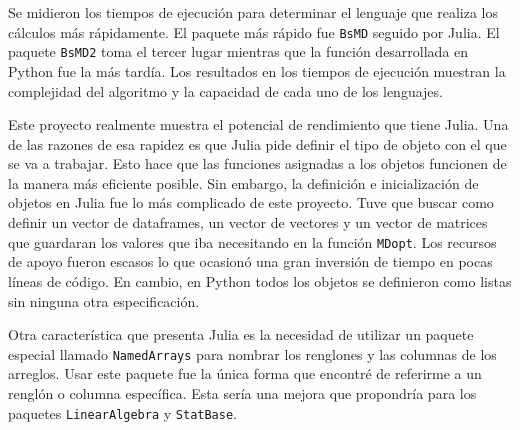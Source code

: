 Se midieron los tiempos de ejecución para determinar el lenguaje que realiza los cálculos más rápidamente. El paquete más rápido fue \texttt{BsMD} seguido por \textsf{Julia}. El paquete \texttt{BsMD2} toma el tercer lugar mientras que la función desarrollada en \textsf{Python} fue la más tardía. Los resultados en los tiempos de ejecución muestran la complejidad del algoritmo y la capacidad de cada uno de los lenguajes. 

Este proyecto realmente muestra el potencial de rendimiento que tiene \textsf{Julia}. Una de las razones de esa rapidez es que \textsf{Julia} pide definir el tipo de objeto con el que se va a trabajar. Esto hace que las funciones asignadas a los objetos funcionen de la manera más eficiente posible. Sin embargo, la definición e inicialización de objetos en \textsf{Julia} fue lo más complicado de este proyecto. Tuve que buscar como definir un vector de dataframes, un vector de vectores y un vector de matrices que guardaran los valores que iba necesitando en la función \texttt{MDopt}. Los recursos de apoyo fueron escasos lo que ocasionó una gran inversión de tiempo en pocas líneas de código. En cambio, en \textsf{Python} todos los objetos se definieron como listas sin ninguna otra especificación. 

Otra característica que presenta \textsf{Julia} es la necesidad de utilizar un paquete especial llamado \texttt{NamedArrays} para nombrar los renglones y las columnas de los arreglos. Usar este paquete fue la única forma que encontré de referirme a un renglón o columna específica. Esta sería una mejora que propondría para los paquetes \texttt{LinearAlgebra} y \texttt{StatBase}. 
















 



